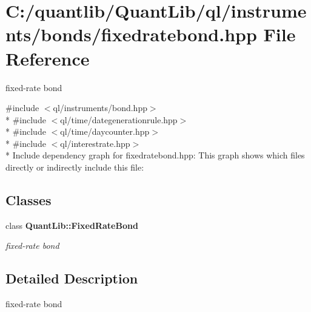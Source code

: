 \section{C\+:/quantlib/\+Quant\+Lib/ql/instruments/bonds/fixedratebond.hpp File Reference}
\label{fixedratebond_8hpp}


fixed-\/rate bond  


{\ttfamily \#include $<$ql/instruments/bond.\+hpp$>$}\\*
{\ttfamily \#include $<$ql/time/dategenerationrule.\+hpp$>$}\\*
{\ttfamily \#include $<$ql/time/daycounter.\+hpp$>$}\\*
{\ttfamily \#include $<$ql/interestrate.\+hpp$>$}\\*
Include dependency graph for fixedratebond.\+hpp\+:
This graph shows which files directly or indirectly include this file\+:
\subsection*{Classes}
\begin{DoxyCompactItemize}
\item 
class {\bf Quant\+Lib\+::\+Fixed\+Rate\+Bond}
\begin{DoxyCompactList}\small\item\em fixed-\/rate bond \end{DoxyCompactList}\end{DoxyCompactItemize}


\subsection{Detailed Description}
fixed-\/rate bond 

